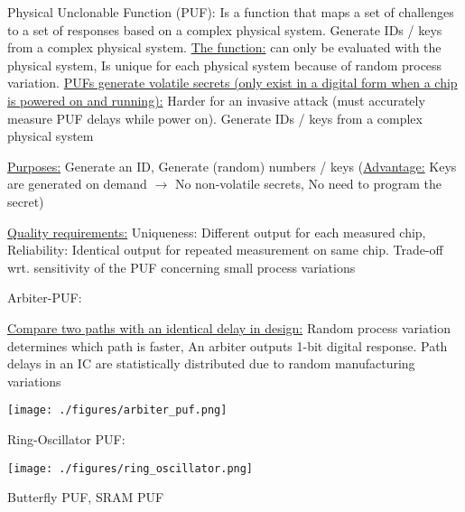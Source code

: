 \documentclass[landscape, a4paper]{article}
\begin{document}
\begin{minipage}[t]{0.2\linewidth}
\begin{betterlist}
\begin{betterlist}
\begin{betterlist}
\begin{betterlist}
\begin{betterlist}
						\item \alert{Physical Unclonable Function (PUF):} Is a function that maps a set of challenges to a set of responses based on a complex physical system.  Generate IDs / keys from a complex physical system. \underline{The function:} can only be evaluated with the physical system, Is unique for each physical system because of random process variation. \uline{PUFs generate volatile secrets (only exist in a digital form when a chip is powered on and running):} Harder for an invasive attack (must accurately measure PUF delays while power on). Generate IDs / keys from a complex physical system
						\item \underline{Purposes:} Generate an ID, Generate (random) numbers / keys (\underline{Advantage:} Keys are generated on demand $\rightarrow$ No non-volatile secrets, No need to program the secret)
						\item \underline{Quality requirements:} \alert{Uniqueness:} Different output for each measured chip, \alert{Reliability:} Identical output for repeated measurement on same chip. \alert{Trade-off} wrt. sensitivity of the PUF concerning small process variations
						\item \alert{Arbiter-PUF:}
						\begin{betterlist}
							\item \uline{Compare two paths with an identical delay in design:} Random process variation determines which path is faster, An arbiter outputs 1-bit digital response. Path delays in an IC are statistically distributed due to random manufacturing variations
						\end{betterlist}

						\texttt{[image: ./figures/arbiter\_puf.png]}
						\item \alert{Ring-Oscillator PUF:}

						\texttt{[image: ./figures/ring\_oscillator.png]}
						\item \alert{Butterfly PUF}, \alert{SRAM PUF}
					\end{betterlist}
				\end{betterlist}
			\end{betterlist}
		\end{betterlist}
	\end{betterlist}
\end{minipage}
\end{document}
